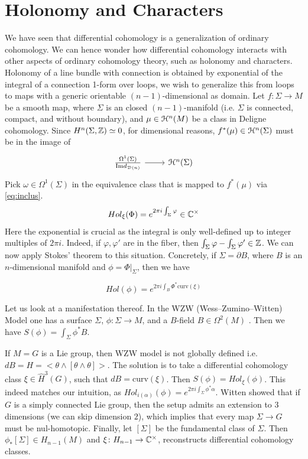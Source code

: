 \documentclass[10pt]{amsart}
\begin{document}
\section{Holonomy and Characters}
We have seen that differential cohomology is a generalization of ordinary cohomology. We can hence wonder how differential cohomology interacts with other aspects of ordinary cohomology theory, such as holonomy and characters. Holonomy of a line bundle with connection is obtained by exponential of the integral of a connection 1-form over loops, we wish to generalize this from loops to maps with a generic orientable $(n-1)$-dimensional as domain. Let $f: \Sigma \to M$ be a smooth map, where $\Sigma$ is an closed $(n-1)$-manifold (i.e. $\Sigma$ is connected, compact, and without boundary), and $\mu\in\mathcal{H}^n(M)$ be a class in Deligne cohomology. Since $H^n(\Sigma,\mathbb{Z})\simeq0$, for dimensional reasons, $f^*(\mu)\in\mathcal{H}^n(\Sigma)$ must be in the image of \begin{equation}\label{eq:inclus}
	\begin{tikzcd}
		\frac{\Omega^1(\Sigma)}{\mathrm{Im}d_{\lD(n)}} \arrow[r] & \lH^n(\Sigma)
	\end{tikzcd}
\end{equation}Pick $\omega\in\Omega^1(\Sigma)$ in the equivalence class that is mapped to $f^*(\mu)$ via \cref{eq:inclus}. 
\[Hol_\xi(\Phi) = e^{2\pi i\int_{\Sigma}\varphi} \in \mathbb{C}^\times\] 
Here the exponential is crucial as the integral is only well-defined up to integer multiples of $2\pi i$. Indeed, if $\varphi, \varphi'$ are in the fiber, then $\int_\Sigma \varphi - \int_\Sigma \varphi' \in \mathbb{Z}$. We can now apply Stokes' theorem to this situation. Concretely, if $\Sigma = \partial B$, where $B$ is an $n$-dimensional manifold and $\phi = \Phi|_\Sigma$, then we have

\[ Hol(\phi) = e^{2\pi i \int_B \Phi^*\mathrm{curv}(\xi)}\]

Let us look at a manifestation thereof. In the WZW (Wess–Zumino–Witten) Model one has a surface $\Sigma$, $\phi\colon \Sigma \to M$, and a $B$-field $B \in \Omega^2(M)$ . Then we have $S(\phi) = \int_\Sigma \phi^*B$.   

If $M = G$ is a Lie group, then WZW model is not globally defined i.e. $dB = H = <\theta \wedge [\theta \wedge \theta]>$. The solution is to take a differential cohomology class $\xi \in \hat{H}^3(G)$, such that  $dB = \mathrm{curv}(\xi)$. Then $S(\phi) = Hol_\xi(\phi)$. This indeed matches our intuition, as $Hol_{i(\alpha)}(\phi) = e^{2\pi i \int_\Sigma \phi^*\alpha}$. Witten showed that if $G$ is a simply connected Lie group, then the setup admits an extension to $3$ dimensions (we can skip dimension $2$), which implies that every map $\Sigma \to G$ must be nul-homotopic. Finally, let $[\Sigma]$ be the fundamental class of $\Sigma$. Then $\phi_*[\Sigma] \in H_{n-1}(M)$ and $\xi\colon H_{n-1} \to \mathbb{C}^\times$, reconstructs differential cohomology classes.

{\footnotesize


}
\end{document}

